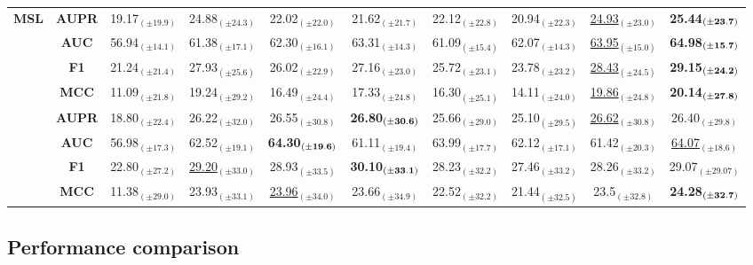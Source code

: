 \begin{table}[t]
\begin{tabular*}{\textwidth}{@{\extracolsep{\fill}} l |c | ccccccc | >{\columncolor{FireBrick!40}}c }
 \multirow{4}{*}{\bf MSL} & \bf AUPR & 19.17$_{(\pm19.9)}$ & 24.88$_{(\pm24.3)}$ & 22.02$_{(\pm22.0)}$ & 21.62$_{(\pm21.7)}$ & 22.12$_{(\pm22.8)}$ & 20.94$_{(\pm22.3)}$ & \underline{24.93$_{(\pm23.0)}$} & \bf 25.44$_{(\bf\pm23.7)}$ \\
 & \bf AUC & 56.94$_{(\pm14.1)}$ & 61.38$_{(\pm17.1)}$ & 62.30$_{(\pm16.1)}$ & 63.31$_{(\pm14.3)}$ & 61.09$_{(\pm15.4)}$ & 62.07$_{(\pm14.3)}$ & \underline{63.95$_{(\pm15.0)}$} & \bf 64.98$_{(\bf\pm15.7)}$ \\
 & \bf F1 & 21.24$_{(\pm21.4)}$ & 27.93$_{(\pm25.6)}$ & 26.02$_{(\pm22.9)}$ & 27.16$_{(\pm23.0)}$ & 25.72$_{(\pm23.1)}$ & 23.78$_{(\pm23.2)}$ & \underline{28.43$_{(\pm24.5)}$} & \bf 29.15$_{(\bf\pm24.2)}$ \\
 & \bf MCC & 11.09$_{(\pm21.8)}$ & 19.24$_{(\pm29.2)}$ & 16.49$_{(\pm24.4)}$ & 17.33$_{(\pm24.8)}$ & 16.30$_{(\pm25.1)}$ & 14.11$_{(\pm24.0)}$ & \underline{19.86$_{(\pm24.8)}$} & \bf 20.14$_{(\bf\pm27.8)}$ \\

\addlinespace    
\cmidrule{1-10}
 \multirow{4}{*}{\bf SMAP} & \bf AUPR & 18.80$_{(\pm22.4)}$ & 26.22$_{(\pm32.0)}$ & 26.55$_{(\pm30.8)}$ & \bf 26.80$_{(\bf\pm30.6)}$ & 25.66$_{(\pm29.0)}$ & 25.10$_{(\pm29.5)}$ & \underline{26.62$_{(\pm30.8)}$} & 26.40$_{(\pm29.8)}$ \\
 & \bf AUC & 56.98$_{(\pm17.3)}$ & 62.52$_{(\pm19.1)}$ & \bf 64.30$_{(\bf\pm19.6)}$ & 61.11$_{(\pm19.4)}$ & 63.99$_{(\pm17.7)}$ & 62.12$_{(\pm17.1)}$ & 61.42$_{(\pm20.3)}$ & \underline{64.07$_{(\pm18.6)}$} \\
 & \bf F1 & 22.80$_{(\pm27.2)}$ & \underline{29.20$_{(\pm33.0)}$} & 28.93$_{(\pm33.5)}$ & \bf 30.10$_{(\bf\pm33.1)}$ & 28.23$_{(\pm32.2)}$ & 27.46$_{(\pm33.2)}$ & 28.26$_{(\pm33.2)}$ & 29.07$_{(\pm29.07)}$ \\
 & \bf MCC & 11.38$_{(\pm29.0)}$ & 23.93$_{(\pm33.1)}$ & \underline{23.96$_{(\pm34.0)}$} & 23.66$_{(\pm34.9)}$ & 22.52$_{(\pm32.2)}$ & 21.44$_{(\pm32.5)}$ &  23.5$_{(\pm32.8)}$ & \bf 24.28$_{(\bf\pm32.7)}$ \\


\bottomrule
\end{tabular*}
\end{table}




\subsection{Performance comparison}


